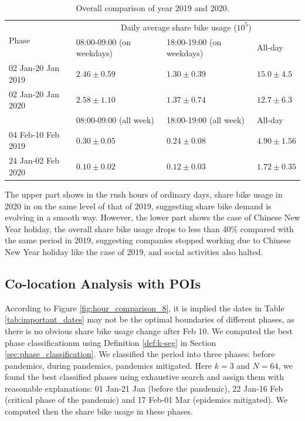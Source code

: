\documentclass[ijgi,submit,moreauthors,pdftex]{Definitions/mdpi}
\begin{document}
\begin{table}[ht]
    \centering
    \begin{tabular}{|l|l|l|l|}
        \hline
        \multirow{2}{*}{Phase} &\multicolumn{3}{c|}{Daily average share bike usage ($10^{5}$)}\\
        \cline{2-4}
        & 08:00-09:00 (on weekdays) & 18:00-19:00 (on weekdays) & All-day\\
        \hline
        02 Jan-20 Jan 2019 & $2.46\pm0.59$ & $1.30\pm0.39$ & $15.0\pm4.5$\\
        \hline
        02 Jan-20 Jan 2020 & $2.58\pm1.10$ & $1.37\pm0.74$ & $12.7\pm6.3$\\
        \hline
        \hline
        & 08:00-09:00 (all week)  & 18:00-19:00 (all week) & All-day\\
        \hline
        04 Feb-10 Feb 2019 & $0.30\pm0.05$ & $0.24\pm0.08$ & $4.90\pm1.56$\\
        \hline
        24 Jan-02 Feb 2020 & $0.10\pm0.02$ & $0.12\pm0.03$ & $1.72\pm0.35$\\
        \hline
    \end{tabular}
    \caption{Overall comparison of year 2019 and 2020.}
    \label{tab:overall_comparison}
\end{table}

The upper part shows in the rush hours of ordinary days, share bike usage in 2020 in on the same level of that of 2019, suggesting share bike demand is evolving in a smooth way.
However, the lower part shows the case of Chinese New Year holiday, the overall share bike usage drops to less than 40\% compared with the same period in 2019, suggesting companies stopped working due to Chinese New Year holiday like the case of 2019, and social activities also halted. 

\subsection{Co-location Analysis with POIs}\label{sec:colo-poi}

According to Figure \ref{fig:hour_comparison_8}, it is implied the dates in Table \ref{tab:important_dates} may not be the optimal boundaries of different phases, as there is no obvious share bike usage change after Feb 10.
We computed the best phase classificationm using Definition \ref{def:k-seg} in Section \ref{sec:phase_classification}.
We classified the period into three phases: before pandemics, during pandemics, pandemics mitigated.
Here $k=3$ and $N=64$, we found the best classified phases using exhaustive search and assign them with reasonable explanations: 01 Jan-21 Jan (before the pandemic), 22 Jan-16 Feb (critical phase of the pandemic) and 17 Feb-01 Mar (epidemics mitigated).
We computed then the share bike usage in these phases.
\end{document}
